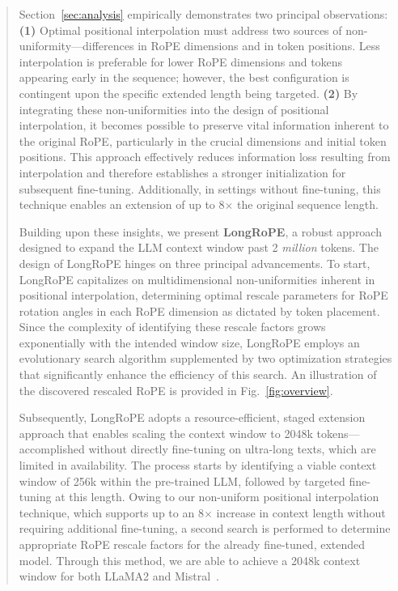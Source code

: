 \begin{abstract}
Section~\ref{sec:analysis} empirically demonstrates two principal observations: \textbf{(1)} Optimal positional interpolation must address two sources of non-uniformity—differences in RoPE dimensions and in token positions. Less interpolation is preferable for lower RoPE dimensions and tokens appearing early in the sequence; however, the best configuration is contingent upon the specific extended length being targeted. \textbf{(2)} By integrating these non-uniformities into the design of positional interpolation, it becomes possible to preserve vital information inherent to the original RoPE, particularly in the crucial dimensions and initial token positions. This approach effectively reduces information loss resulting from interpolation and therefore establishes a stronger initialization for subsequent fine-tuning. Additionally, in settings without fine-tuning, this technique enables an extension of up to 8$\times$ the original sequence length.

Building upon these insights, we present \textbf{LongRoPE}, a robust approach designed to expand the LLM context window past 2 \emph{million} tokens. The design of LongRoPE hinges on three principal advancements. To start, {LongRoPE} capitalizes on multidimensional non-uniformities inherent in positional interpolation, determining optimal rescale parameters for RoPE rotation angles in each RoPE dimension as dictated by token placement. Since the complexity of identifying these rescale factors grows exponentially with the intended window size, {LongRoPE} employs an evolutionary search algorithm supplemented by two optimization strategies that significantly enhance the efficiency of this search. An illustration of the discovered rescaled RoPE is provided in Fig.~\ref{fig:overview}.

Subsequently, {LongRoPE} adopts a resource-efficient, staged extension approach that enables scaling the context window to 2048k tokens—accomplished without directly fine-tuning on ultra-long texts, which are limited in availability. The process starts by identifying a viable context window of 256k within the pre-trained LLM, followed by targeted fine-tuning at this length. Owing to our non-uniform positional interpolation technique, which supports up to an 8$\times$ increase in context length without requiring additional fine-tuning, a second search is performed to determine appropriate RoPE rescale factors for the already fine-tuned, extended model. Through this method, we are able to achieve a 2048k context window for both LLaMA2 and Mistral~\cite{mistral}.


\end{abstract}
